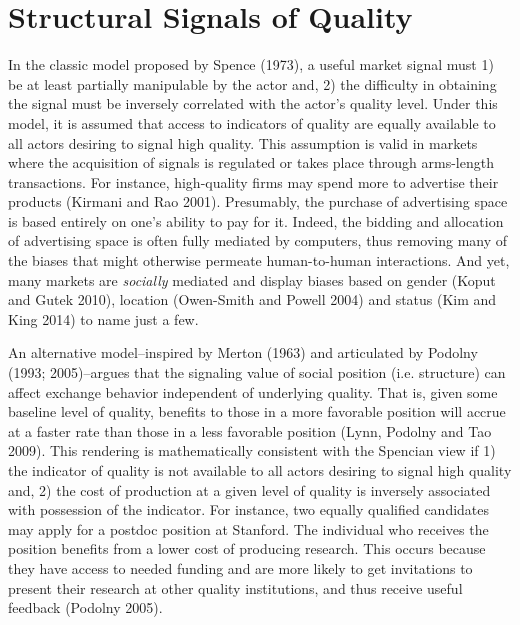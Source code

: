 \section{Structural Signals of Quality}

In the classic model proposed by Spence (1973), a useful market signal must 1) be at least partially manipulable by the actor and, 2) the difficulty in obtaining the signal must be inversely correlated with the actor's quality level. Under this model, it is assumed that access to indicators of quality are equally available to all actors desiring to signal high quality. This assumption is valid in markets where the acquisition of signals is regulated or takes place through arms-length transactions. For instance, high-quality firms may spend more to advertise their products (Kirmani and Rao 2001). Presumably, the purchase of advertising space is based entirely on one's ability to pay for it. Indeed, the bidding and allocation of advertising space is often fully mediated by computers, thus removing many of the biases that might otherwise permeate human-to-human interactions. And yet, many markets are \emph{socially} mediated and display biases based on gender (Koput and Gutek 2010), location (Owen-Smith and Powell 2004) and status (Kim and King 2014) to name just a few. 

An alternative model--inspired by Merton (1963) and articulated by Podolny (1993; 2005)--argues that the signaling value of social position (i.e. structure) can affect exchange behavior independent of underlying quality. That is, given some baseline level of quality, benefits to those in a more favorable position will accrue at a faster rate than those in a less favorable position (Lynn, Podolny and Tao 2009). This rendering is mathematically consistent with the Spencian view if 1) the indicator of quality is not available to all actors desiring to signal high quality and, 2) the cost of production at a given level of quality is inversely associated with possession of the indicator. For instance, two equally qualified candidates may apply for a postdoc position at Stanford. The individual who receives the position benefits from a lower cost of producing research. This occurs because they have access to needed funding and are more likely to get invitations to present their research at other quality institutions, and thus receive useful feedback (Podolny 2005).

